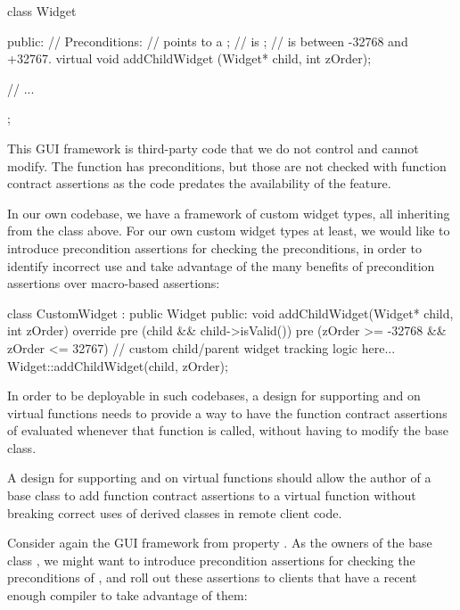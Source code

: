 \begin{codeblock}
class Widget {
public:
  // Preconditions:   
  // \phantom{xxx} points to a ;
  // \phantom{xxx} is ; 
  // \phantom{xxx} is between -32768 and +32767.
  virtual void addChildWidget (Widget* child, int zOrder);
  
// ...
};
\end{codeblock}
This GUI framework is third-party code that we do not control and cannot modify. The function \allowbreak{} has preconditions, but those are not checked with function contract assertions as the code predates the availability of the feature.

In our own codebase, we have a framework of custom widget types, all inheriting from the  class above. For our own custom widget types at least, we would like to introduce precondition assertions for checking the preconditions, in order to identify incorrect use and take advantage of the many benefits of precondition assertions over macro-based assertions:
\begin{codeblock}
class CustomWidget : public Widget {
public:
  void addChildWidget(Widget* child, int zOrder) override
    pre (child && child->isValid())
    pre (zOrder >= -32768 && zOrder <= 32767) 
  {
    // custom child/parent widget tracking logic here...
    Widget::addChildWidget(child, zOrder);
  }
}
\end{codeblock}
In order to be deployable in such codebases, a design for supporting  and  on virtual functions needs to provide a way to have the function contract assertions of \allowbreak{} evaluated whenever that function is called, without having to modify the   base class.



A design for supporting  and  on virtual functions should allow the author of a base class to add function contract assertions to a virtual function without breaking correct uses of derived classes in remote client code.

Consider again the GUI framework from property . As the owners of the base class , we might want to introduce precondition assertions for checking the preconditions of \allowbreak{}, and roll out these assertions to clients that have a recent enough compiler to take advantage of them: 

